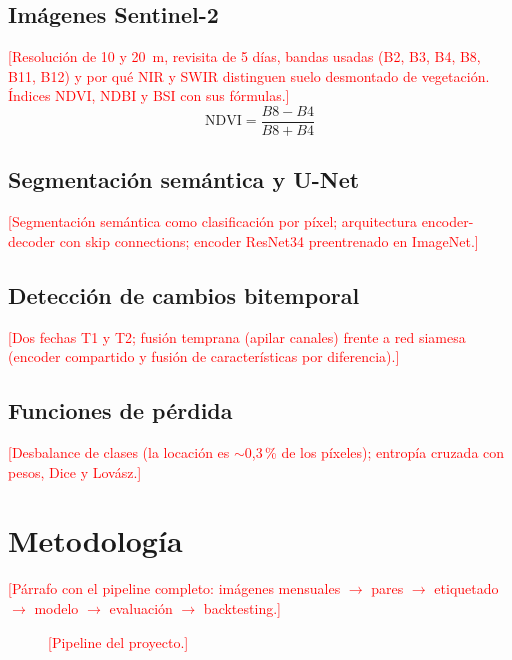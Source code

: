 \documentclass[10pt,a4paper]{article}
\newcommand{\pend}[1]{\textcolor{red}{[#1]}}
\newcommand{\figpend}[1]{\fbox{\parbox[c][3.5cm][c]{0.92\columnwidth}{\centering\small\textcolor{red}{#1}}}}
\begin{document}
\subsection{Imágenes Sentinel-2}
\pend{Resolución de 10 y 20~m, revisita de 5 días, bandas usadas (B2, B3, B4, B8, B11, B12) y por qué NIR y SWIR
distinguen suelo desmontado de vegetación. Índices NDVI, NDBI y BSI con sus fórmulas.}
\begin{equation}
\mathrm{NDVI} = \frac{B8 - B4}{B8 + B4}
\label{eq:ndvi}
\end{equation}

\subsection{Segmentación semántica y U-Net}
\pend{Segmentación semántica como clasificación por píxel; arquitectura encoder-decoder con skip connections; encoder ResNet34 preentrenado en ImageNet.}

\subsection{Detección de cambios bitemporal}
\pend{Dos fechas T1 y T2; fusión temprana (apilar canales) frente a red siamesa (encoder compartido y fusión de características por diferencia).}

\subsection{Funciones de pérdida}
\pend{Desbalance de clases (la locación es $\sim$0,3\,\% de los píxeles); entropía cruzada con pesos, Dice y Lovász.}


\section{Metodología}

\pend{Párrafo con el pipeline completo: imágenes mensuales $\rightarrow$ pares $\rightarrow$ etiquetado $\rightarrow$ modelo $\rightarrow$ evaluación $\rightarrow$ backtesting.}

\begin{figure}[t]
\centering
\figpend{Figura: diagrama del pipeline}
\caption{\pend{Pipeline del proyecto.}}
\label{fig:pipeline}
\end{figure}
\end{document}
